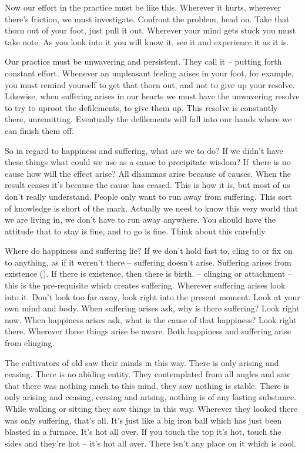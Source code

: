 Now our effort in the practice must be like this. Wherever it hurts, wher\-ever there's friction, we must investigate. Confront the problem, head on. Take that thorn out of your foot, just pull it out. Wherever your mind gets stuck you must take note. As you look into it you will know it, see it and experience it as it is.

Our practice must be unwavering and persistent. They call it  -- putting forth constant effort. Whenever an unpleasant feeling arises in your foot, for example, you must remind yourself to get that thorn out, and not to give up your resolve. Likewise, when suffering arises in our hearts we must have the unwavering resolve to try to uproot the defilements, to give them up. This resolve is constantly there, unremitting. Eventually the defilements will fall into our hands where we can finish them off.

So in regard to happiness and suffering, what are we to do? If we didn't have these things what could we use as a cause to precipitate wisdom? If~there is no cause how will the effect arise? All dhammas arise because of causes. When the result ceases it's because the cause has ceased. This is how it is, but most of us don't really understand. People only want to run away from suffering. This sort of knowledge is short of the mark. Actually we need to know this very world that we are living in, we don't have to run away anywhere. You should have the attitude that to stay is fine, and to go is fine. Think about this carefully.

Where do happiness and suffering lie? If we don't hold fast to, cling to or fix on to anything, as if it weren't there -- suffering doesn't arise. Suffering arises from existence (). If there is existence, then there is birth.  -- clinging or attachment -- this is the pre-requisite which creates suffering. Wherever suffering arises look into it. Don't look too far away, look right into the present moment. Look at your own mind and body. When suffering arises ask, why is there suffering? Look right now. When happiness arises ask, what is the cause of that happiness? Look right there. Wherever these things arise be aware. Both happiness and suffering arise from clinging.

The cultivators of old saw their minds in this way. There is only arising and ceasing. There is no abiding entity. They contemplated from all angles and saw that there was nothing much to this mind, they saw nothing is stable. There is only arising and ceasing, ceasing and arising, nothing is of any lasting substance. While walking or sitting they saw things in this way. Wherever they looked there was only suffering, that's all. It's just like a big iron ball which has just been blasted in a furnace. It's hot all over. If you touch the top it's hot, touch the sides and they're hot -- it's hot all over. There isn't any place on it which is cool.

